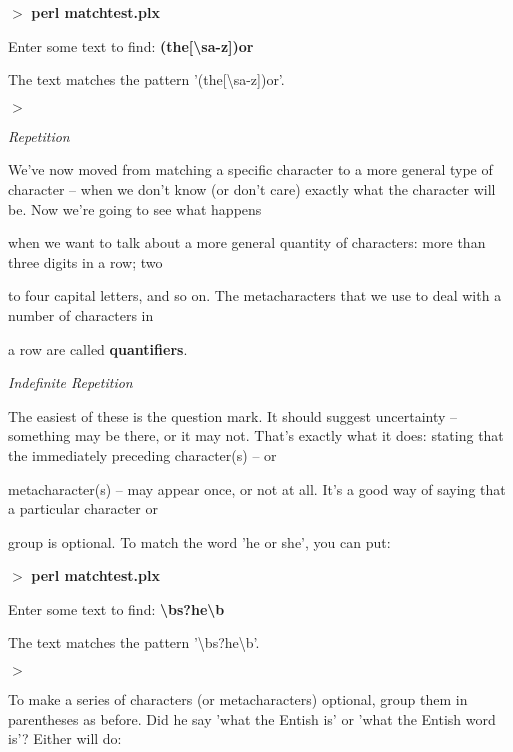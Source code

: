 \documentclass[a4paper,11pt]{book}
\begin{document}
\noindent 

\noindent $>$ \textbf{perl matchtest.plx}

\noindent Enter some text to find: \textbf{(the[\textbackslash sa-z])\textbar or}

\noindent The text matches the pattern '(the[\textbackslash sa-z])\textbar or'.

\noindent $>$

\noindent 

\noindent \textit{Repetition}

\noindent We've now moved from matching a specific character to a more general type of character -- when we don't know (or don't care) exactly what the character will be. Now we're going to see what happens

\noindent when we want to talk about a more general quantity of characters: more than three digits in a row; two

\noindent to four capital letters, and so on. The metacharacters that we use to deal with a number of characters in

\noindent a row are called \textbf{quantifiers}.

\noindent 

\noindent 

\noindent \textit{Indefinite Repetition}

\noindent The easiest of these is the question mark. It should suggest uncertainty -- something may be there, or it may not. That's exactly what it does: stating that the immediately preceding character(s) -- or

\noindent metacharacter(s) -- may appear once, or not at all. It's a good way of saying that a particular character or

\noindent group is optional. To match the word 'he or she', you can put:

\noindent 

\noindent $>$ \textbf{perl matchtest.plx}

\noindent Enter some text to find: \textbf{\textbackslash bs?he\textbackslash b}

\noindent The text matches the pattern '\textbackslash bs?he\textbackslash b'.

\noindent $>$

\noindent 

\noindent To make a series of characters (or metacharacters) optional, group them in parentheses as before. Did he say 'what the Entish is' or 'what the Entish word is'? Either will do:
\end{document}
